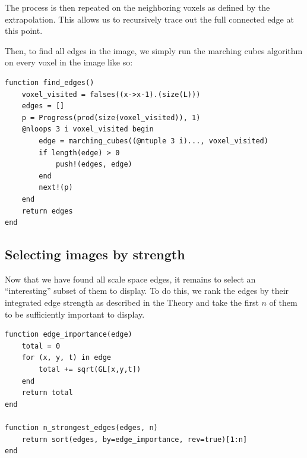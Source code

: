 \documentclass{article}
\begin{document}
The process is then repeated on the neighboring voxels as defined by the extrapolation.
This allows us to recursively trace out the full connected edge at this point.





Then, to find all edges in the image, we simply run the marching cubes algorithm on every voxel in the image like so:
\begin{lstlisting}
function find_edges()
    voxel_visited = falses((x->x-1).(size(L)))
    edges = []
    p = Progress(prod(size(voxel_visited)), 1)
    @nloops 3 i voxel_visited begin
        edge = marching_cubes((@ntuple 3 i)..., voxel_visited)
        if length(edge) > 0
            push!(edges, edge)
        end
        next!(p)
    end
    return edges
end
\end{lstlisting}

\subsection{Selecting images by strength}

Now that we have found all scale space edges, it remains to select an ``interesting'' subset of them to display.
To do this, we rank the edges by their integrated edge strength as described in the Theory and take the first $n$ of them to be sufficiently important to display.
\begin{lstlisting}
function edge_importance(edge)
    total = 0
    for (x, y, t) in edge
        total += sqrt(GL[x,y,t])
    end
    return total
end

function n_strongest_edges(edges, n)
    return sort(edges, by=edge_importance, rev=true)[1:n]
end
\end{lstlisting}
\end{document}
